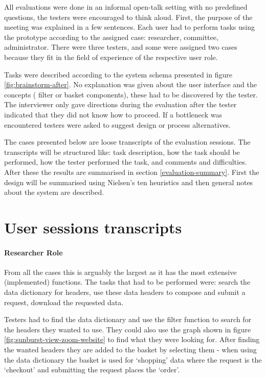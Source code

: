 All evaluations were done in an informal open-talk setting with no predefined questions, the testers were encouraged to think aloud.
First, the purpose of the meeting was explained in a few sentences.
Each user had to perform tasks using the prototype according to the assigned case: researcher, committee, administrator.
There were three testers, and some were assigned two cases because they fit in the field of experience of the respective user role.

Tasks were described according to the system schema presented in figure \ref{fig:brainstorm-after}.
No explanation was given about the user interface and the concepts (\eg{} filter or basket components), these had to be discovered by the tester.
The interviewer only gave directions during the evaluation after the tester indicated that they did not know how to proceed.
If a bottleneck was encountered testers were asked to suggest design or process alternatives.

The  cases presented below are loose transcripts of the evaluation sessions.
The transcripts will be structured like: task description, how the task should be performed, how the tester performed the task, and comments and difficulties.
After these the results are summarised in section \ref{evaluation-summary}.
First the design will be summarised using Nielsen's ten heuristics \cite{designHeuristics} and then general notes about the system are described.

\section{User sessions transcripts}

\paragraph{Researcher Role}
From all the cases this is arguably the largest as it has the most extensive (implemented) functions.
The tasks that had to be performed were: search the data dictionary for headers, use these data headers to compose and submit a request, download the requested data.

Testers had to find the data dictionary and use the filter function to search for the headers they wanted to use.
They could also use the graph shown in figure \ref{fig:sunburst-view-zoom-website} to find what they were looking for.
After finding the wanted headers they are added to the basket by selecting them - when using the data dictionary the basket is used for `shopping' data where the request is the `checkout' and submitting the request places the `order'.

